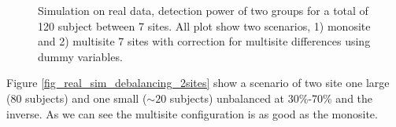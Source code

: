 \documentclass[authoryear]{elsarticle}
\begin{document}
\begin{figure}
\centering
\captionsetup[subfloat]{labelformat=empty}
\hspace{1mm}
\hspace{1mm}
\hspace{1mm}
\tiny Simulation on real data, detection power of two groups for a total of 120 subject between 7 sites. All plot show two scenarios, 1) monosite and 2) multisite 7 sites with correction for multisite differences using dummy variables.
\label{fig_real_sim_debalancing_interact}
\end{figure}

Figure \ref{fig_real_sim_debalancing_2sites} show a scenario of two site one large (80 subjects) and one small ($\sim20$ subjects) unbalanced at 30\%-70\% and the inverse. As we can see the multisite configuration is as good as the monosite.
\end{document}
